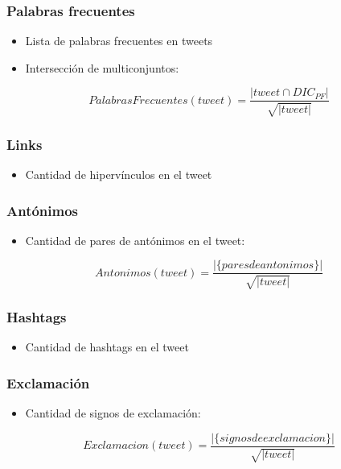 \begin{frame}
    \frametitle{Palabras frecuentes}

    \begin{itemize}
        \item Lista de palabras frecuentes en tweets
        \item Intersección de multiconjuntos:
    \end{itemize}

    \begin{center}
        \[
            PalabrasFrecuentes(tweet) = \frac{|tweet \cap DIC_{PF}|}{\sqrt{|tweet|}}
        \]
    \end{center}
\end{frame}

\begin{frame}
    \frametitle{Links}

    \begin{itemize}
        \item Cantidad de hipervínculos en el tweet
    \end{itemize}
\end{frame}

\begin{frame}
    \frametitle{Antónimos}

    \begin{itemize}
        \item Cantidad de pares de antónimos en el tweet:
    \end{itemize}

    \begin{center}
        \[
            Antonimos(tweet) = \frac{|\{pares de antonimos\}|}{\sqrt{|tweet|}}
        \]
    \end{center}
\end{frame}

\begin{frame}
    \frametitle{Hashtags}

    \begin{itemize}
        \item Cantidad de hashtags en el tweet
    \end{itemize}
\end{frame}

\begin{frame}
    \frametitle{Exclamación}

    \begin{itemize}
        \item Cantidad de signos de exclamación:
    \end{itemize}

    \begin{center}
        \[
            Exclamacion(tweet) = \frac{|\{signos de exclamacion\}|}{\sqrt{|tweet|}}
        \]
    \end{center}
\end{frame}

